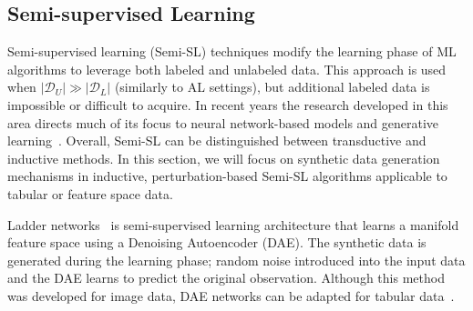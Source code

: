 \documentclass[parskip=full]{scrartcl}
\begin{document}
% 
% 
% 
% 

\subsection{Semi-supervised Learning}\label{sec:semi-supervised-learning}

Semi-supervised learning (Semi-SL) techniques modify the learning phase of ML
algorithms to leverage both labeled and unlabeled data. This approach is used
when $|\mathcal{D}_U| \gg |\mathcal{D}_L|$ (similarly to AL settings), but
additional labeled data is impossible or difficult to acquire. In recent years
the research developed in this area directs much of its focus to neural
network-based models and generative learning~\cite{van2020survey}. Overall,
Semi-SL can be distinguished between transductive and inductive methods. In
this section, we will focus on synthetic data generation mechanisms in
inductive, perturbation-based Semi-SL algorithms applicable to tabular or
feature space data.

Ladder networks~\cite{rasmus2015semi} is semi-supervised learning architecture
that learns a manifold feature space using a Denoising Autoencoder (DAE). The
synthetic data is generated during the learning phase; random noise introduced
into the input data and the DAE learns to predict the original observation.
Although this method was developed for image data, DAE networks can be adapted
for tabular data~\cite{sattarov2022explaining}.
\end{document}
